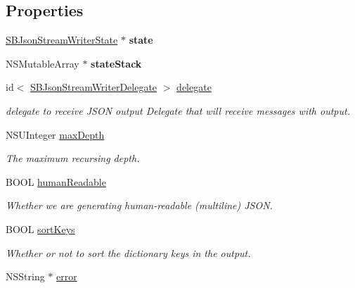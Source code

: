 \subsection*{Properties}
\begin{DoxyCompactItemize}
\item 
\hypertarget{interface_s_b_json_stream_writer_a7f36b32ca0655d336ea779d833c73cbf}{\hyperlink{interface_s_b_json_stream_writer_state}{S\-B\-Json\-Stream\-Writer\-State} $\ast$ {\bfseries state}}\label{interface_s_b_json_stream_writer_a7f36b32ca0655d336ea779d833c73cbf}

\item 
\hypertarget{interface_s_b_json_stream_writer_aea566328c0381c818d49b656890819eb}{N\-S\-Mutable\-Array $\ast$ {\bfseries state\-Stack}}\label{interface_s_b_json_stream_writer_aea566328c0381c818d49b656890819eb}

\item 
\hypertarget{interface_s_b_json_stream_writer_a28dc79aeee865687fafdf84836c1444d}{id$<$ \hyperlink{protocol_s_b_json_stream_writer_delegate-p}{S\-B\-Json\-Stream\-Writer\-Delegate} $>$ \hyperlink{interface_s_b_json_stream_writer_a28dc79aeee865687fafdf84836c1444d}{delegate}}\label{interface_s_b_json_stream_writer_a28dc79aeee865687fafdf84836c1444d}

\begin{DoxyCompactList}\small\item\em delegate to receive J\-S\-O\-N output Delegate that will receive messages with output. \end{DoxyCompactList}\item 
N\-S\-U\-Integer \hyperlink{interface_s_b_json_stream_writer_a146e7e950ab74a0e766ffd860e454fc9}{max\-Depth}
\begin{DoxyCompactList}\small\item\em The maximum recursing depth. \end{DoxyCompactList}\item 
B\-O\-O\-L \hyperlink{interface_s_b_json_stream_writer_af43e8bd7170d6128480515f532b7b791}{human\-Readable}
\begin{DoxyCompactList}\small\item\em Whether we are generating human-\/readable (multiline) J\-S\-O\-N. \end{DoxyCompactList}\item 
B\-O\-O\-L \hyperlink{interface_s_b_json_stream_writer_ab206c6844a0fd20307b5dfe881e17bf2}{sort\-Keys}
\begin{DoxyCompactList}\small\item\em Whether or not to sort the dictionary keys in the output. \end{DoxyCompactList}\item 
\hypertarget{interface_s_b_json_stream_writer_a7b4739905d4f23e82e5efd14b8acabea}{N\-S\-String $\ast$ \hyperlink{interface_s_b_json_stream_writer_a7b4739905d4f23e82e5efd14b8acabea}{error}}\label{interface_s_b_json_stream_writer_a7b4739905d4f23e82e5efd14b8acabea}


\end{DoxyCompactItemize}
